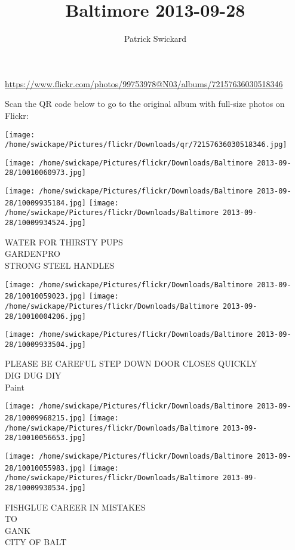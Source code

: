 \documentclass[10pt,letterpaper]{article}
\title{Baltimore 2013-09-28}
\author{Patrick Swickard}
\date{}
\begin{document}
\maketitle

\url{https://www.flickr.com/photos/99753978@N03/albums/72157636030518346}

Scan the QR code below to go to the original album with full-size photos on Flickr:

\texttt{[image: /home/swickape/Pictures/flickr/Downloads/qr/72157636030518346.jpg]}
\pagebreak

\texttt{[image: /home/swickape/Pictures/flickr/Downloads/Baltimore 2013-09-28/10010060973.jpg]}

\vspace{0.25in}
\texttt{[image: /home/swickape/Pictures/flickr/Downloads/Baltimore 2013-09-28/10009935184.jpg]}
\texttt{[image: /home/swickape/Pictures/flickr/Downloads/Baltimore 2013-09-28/10009934524.jpg]}

WATER FOR THIRSTY PUPS\\
GARDENPRO\\
STRONG STEEL HANDLES
\pagebreak

\texttt{[image: /home/swickape/Pictures/flickr/Downloads/Baltimore 2013-09-28/10010059023.jpg]}
\texttt{[image: /home/swickape/Pictures/flickr/Downloads/Baltimore 2013-09-28/10010004206.jpg]}

\vspace{0.25in}
\texttt{[image: /home/swickape/Pictures/flickr/Downloads/Baltimore 2013-09-28/10009933504.jpg]}

PLEASE BE CAREFUL STEP DOWN DOOR CLOSES QUICKLY\\
DIG DUG DIY\\
Paint
\pagebreak

\texttt{[image: /home/swickape/Pictures/flickr/Downloads/Baltimore 2013-09-28/10009968215.jpg]}
\texttt{[image: /home/swickape/Pictures/flickr/Downloads/Baltimore 2013-09-28/10010056653.jpg]}

\texttt{[image: /home/swickape/Pictures/flickr/Downloads/Baltimore 2013-09-28/10010055983.jpg]}
\texttt{[image: /home/swickape/Pictures/flickr/Downloads/Baltimore 2013-09-28/10009930534.jpg]}

FISHGLUE CAREER IN MISTAKES\\
TO\\
GANK\\
CITY OF BALT
\pagebreak
\end{document}
